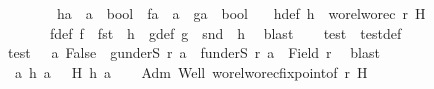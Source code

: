 \begin{isabellebody}
\ \ \isamarkupfalse%
\isanewline
\ \ \isanewline
\ \ \isamarkupfalse%
\ h{\isacharcolon}{\kern0pt}{\isacharcolon}{\kern0pt}{\isachardoublequoteopen}{\isacharprime}{\kern0pt}a\ {\isasymRightarrow}\ {\isacharprime}{\kern0pt}a{\isacharprime}{\kern0pt}\ {\isacharasterisk}{\kern0pt}\ bool{\isachardoublequoteclose}\ \ f{\isacharcolon}{\kern0pt}{\isacharcolon}{\kern0pt}{\isachardoublequoteopen}{\isacharprime}{\kern0pt}a\ {\isasymRightarrow}\ {\isacharprime}{\kern0pt}a{\isacharprime}{\kern0pt}{\isachardoublequoteclose}\ \ g{\isacharcolon}{\kern0pt}{\isacharcolon}{\kern0pt}{\isachardoublequoteopen}{\isacharprime}{\kern0pt}a\ {\isasymRightarrow}\ bool{\isachardoublequoteclose}\isanewline
\ \ \ h{\isacharunderscore}{\kern0pt}def{\isacharcolon}{\kern0pt}\ {\isachardoublequoteopen}h\ {\isacharequal}{\kern0pt}\ wo{\isacharunderscore}{\kern0pt}rel{\isachardot}{\kern0pt}worec\ r\ H{\isachardoublequoteclose}\ \isanewline
\ \ \ \ \ \ \ \ f{\isacharunderscore}{\kern0pt}def{\isacharcolon}{\kern0pt}\ {\isachardoublequoteopen}f\ {\isacharequal}{\kern0pt}\ fst\ {\isasymcirc}\ h{\isachardoublequoteclose}\ \ g{\isacharunderscore}{\kern0pt}def{\isacharcolon}{\kern0pt}\ {\isachardoublequoteopen}g\ {\isacharequal}{\kern0pt}\ snd\ {\isasymcirc}\ h{\isachardoublequoteclose}\ \isamarkupfalse%
\ blast\isanewline
\ \ \isamarkupfalse%
\ test\ \ test{\isacharunderscore}{\kern0pt}def{\isacharcolon}{\kern0pt}\isanewline
\ \ {\isachardoublequoteopen}test\ {\isacharequal}{\kern0pt}\ {\isacharparenleft}{\kern0pt}{\isasymlambda}\ a{\isachardot}{\kern0pt}\ False\ {\isasymnotin}\ {\isacharparenleft}{\kern0pt}g{\isacharbackquote}{\kern0pt}{\isacharparenleft}{\kern0pt}underS\ r\ a{\isacharparenright}{\kern0pt}{\isacharparenright}{\kern0pt}\ {\isasymand}\ f{\isacharbackquote}{\kern0pt}{\isacharparenleft}{\kern0pt}underS\ r\ a{\isacharparenright}{\kern0pt}\ {\isasymnoteq}\ Field\ r{\isacharprime}{\kern0pt}{\isacharparenright}{\kern0pt}{\isachardoublequoteclose}\ \isamarkupfalse%
\ blast\isanewline
\ \ \isanewline
\ \ \isamarkupfalse%
\ {\isacharasterisk}{\kern0pt}{\isacharcolon}{\kern0pt}\ {\isachardoublequoteopen}{\isasymAnd}\ a{\isachardot}{\kern0pt}\ h\ a\ \ {\isacharequal}{\kern0pt}\ H\ h\ a{\isachardoublequoteclose}\isanewline
\ \ \isamarkupfalse%
\ Adm\ Well\ wo{\isacharunderscore}{\kern0pt}rel{\isachardot}{\kern0pt}worec{\isacharunderscore}{\kern0pt}fixpoint{\isacharbrackleft}{\kern0pt}of\ r\ H{\isacharbrackright}{\kern0pt}\ \isamarkupfalse%

\end{isabellebody}
